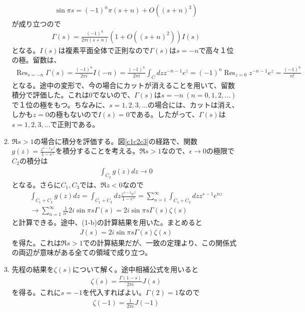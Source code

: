 \documentclass[report,paper=a4, fontsize=12pt, line_length=16cm, number_of_lines=33,dvipdfmx]{jlreq}
\numberwithin{equation}{section}
\DeclareMathOperator*{\Resi}{\mathrm{Res}}
\begin{document}
\begin{enumerate}
\begin{enumerate}
    \begin{align*}
      \sin \pi s = (-1)^n \pi (s+n) + O((s+n)^3)
    \end{align*}
    が成り立つので
    \begin{align*}
      \Gamma(s)=\frac{(-1)^n}{2\pi i (s+n)}(1+O((s+n)^2))I(s)
    \end{align*}
    となる。$I(s)$は複素平面全体で正則なので$\Gamma(s)$は$s=-n$で高々１位の極。留数は、
    \begin{align*}
      \Resi_{s=-n}\Gamma(s)=\frac{(-1)^n}{2\pi i}I(-n)
      =\frac{(-1)^n}{2\pi i}\int_{C}dz z^{-n-1}e^{z}
      =(-1)^n\Resi_{z=0}z^{-n-1}e^{z}
      =\frac{(-1)^n}{n!}
    \end{align*}
    となる。途中の変形で、今の場合にカットが消えることを用いて、留数積分で評価した。これは$0$でないので、$\Gamma(s)$は$s=-n\ (n=0,1,2,\dots)$で１位の極をもつ。ちなみに、$s=1,2,3,\dots$の場合には、カットは消え、しかも$z=0$の極もないので$I(s)=0$である。したがって、$\Gamma(s)$は$s=1,2,3,\dots$で正則である。
    \item $\Re s>1$の場合に積分を評価する。図\ref{c1c2c3}の経路で、関数$g(z)=\frac{z^{s-1}e^{z}}{1-e^{z}}$を積分することを考える。$\Re s >1$なので、$\epsilon\to 0$の極限で$C_2$の積分は
    \begin{align*}
      \int_{C_2}g(z)dz\to 0
    \end{align*}
    となる。さらに$C_1, C_3$では、$\Re z <0$なので
    \begin{align*}
      \int_{C_1+C_3}g(z)dz
      =\int_{C_1+C_3} dz \frac{z^{s-1}e^{z}}{1-e^{z}}
      =\sum_{n=1}^{\infty}\int_{C_1+C_3} dz z^{s-1}e^{nz}\\
      \to \sum_{n=1}^{\infty}\frac{1}{n^s}2i\sin\pi s \Gamma(s)
      =2i\sin\pi s \Gamma(s)\zeta(s)
    \end{align*}
    と計算できる。途中、(1-b)の計算結果を用いた。まとめると
    \begin{align*}
      J(s)=2i\sin \pi s \Gamma(s)\zeta(s)
    \end{align*}
    を得た。これは$\Re s>1$での計算結果だが、一致の定理より、この関係式の両辺が意味がある全ての領域で成り立つ。
    \item 先程の結果を$\zeta(s)$について解く。途中相補公式を用いると
    \begin{align*}
      \zeta(s)=\frac{\Gamma(1-s)}{2\pi i}J(s)
    \end{align*}
    を得る。これに$s=-1$を代入すればよい。$\Gamma(2)=1$なので
    \begin{align*}
      \zeta(-1)
      =\frac{1}{2\pi i}J(-1)

\end{align*}
\end{enumerate}
\end{enumerate}
\end{document}
